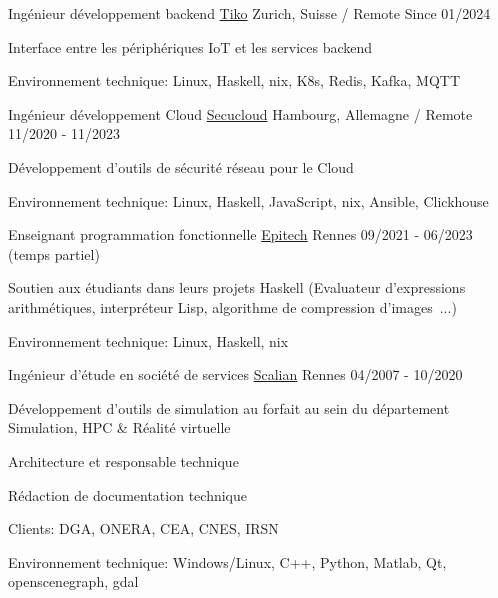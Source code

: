 \begin{cventries}
  \cventry
    {Ingénieur développement backend}
    {\href{https://www.linkedin.com/company/secucloud/}{Tiko}}
    {Zurich, Suisse / Remote}
    {Since 01/2024}
    {
      \begin{cvitems}
        \item {Interface entre les périphériques IoT et les services backend}
        \item {Environnement technique: Linux, Haskell, nix, K8s, Redis, Kafka, MQTT}
      \end{cvitems}
    }

  \cventry
    {Ingénieur développement Cloud}
    {\href{https://www.linkedin.com/company/secucloud/}{Secucloud}}
    {Hambourg, Allemagne / Remote}
    {11/2020 - 11/2023}
    {
      \begin{cvitems}
        \item {Développement d'outils de sécurité réseau pour le Cloud}
        \item {Environnement technique: Linux, Haskell, JavaScript, nix,
            Ansible, Clickhouse}
      \end{cvitems}
    }

  \cventry
    {Enseignant programmation fonctionnelle}
    {\href{https://www.epitech.eu/}{Epitech}}
    {Rennes}
    {09/2021 - 06/2023 (temps partiel)}
    {
      \begin{cvitems}
          \item {Soutien aux étudiants dans leurs projets Haskell (Evaluateur
              d'expressions arithmétiques, interpréteur Lisp, algorithme de
              compression d'images~...)}
          \item {Environnement technique: Linux, Haskell, nix}
      \end{cvitems}
    }

  \cventry
    {Ingénieur d'étude en société de services}
    {\href{https://www.scalian.com/}{Scalian}}
    {Rennes}
    {04/2007 - 10/2020}
    {
      \begin{cvitems}
        \item {Développement d'outils de simulation au forfait au sein du
            département Simulation, HPC \& Réalité virtuelle}
        \item {Architecture et responsable technique}
        \item {Rédaction de documentation technique}
        \item {Clients: DGA, ONERA, CEA, CNES, IRSN}
        \item {Environnement technique: Windows/Linux, C++, Python, Matlab, Qt,
            openscenegraph, gdal}
      \end{cvitems}
    }


\end{cventries}

